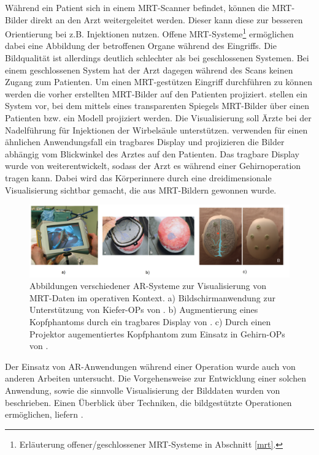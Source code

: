Während ein Patient sich in einem MRT-Scanner befindet, können die MRT-Bilder direkt an den Arzt weitergeleitet werden. Dieser kann diese zur besseren Orientierung bei z.B. Injektionen nutzen. Offene MRT-Systeme\footnote{Erläuterung offener/geschlossener MRT-Systeme in Abschnitt \ref{mrt}.} ermöglichen dabei eine Abbildung der betroffenen Organe während des Eingriffs. Die Bildqualität ist allerdings deutlich schlechter als bei geschlossenen Systemen. Bei einem geschlossenen System hat der Arzt dagegen während des Scans keinen Zugang zum Patienten. Um einen MRT-gestützen Eingriff durchführen zu können werden die vorher erstellten MRT-Bilder auf den Patienten projiziert.
\cite{Fritz2012} stellen ein System vor, bei dem mittels eines transparenten Spiegels MRT-Bilder über einen Patienten bzw. ein Modell projiziert werden. Die Visualisierung soll Ärzte bei der Nadelführung für Injektionen der Wirbelsäule unterstützen. 
\cite{khamene03} verwenden für einen ähnlichen Anwendungsfall ein tragbares Display und projizieren die Bilder abhängig vom Blickwinkel des Arztes auf den Patienten. Das tragbare Display wurde von \cite{khamene01} weiterentwickelt, sodass der Arzt es während einer Gehirnoperation tragen kann. Dabei wird das Körperinnere durch eine dreidimensionale Visualisierung sichtbar gemacht, die aus MRT-Bildern gewonnen wurde. 

\begin{figure}[!htb]
	\centering
	\includegraphics[width=0.9\linewidth]{images/relatedMedicine.png}
	\caption{Abbildungen verschiedener AR-Systeme zur Visualisierung von MRT-Daten im operativen Kontext. a) Bildschirmanwendung zur Unterstützung von Kiefer-OPs von \cite{MISCHKOWSKI2006478}. b) Augmentierung eines Kopfphantoms durch ein tragbares Display von \cite{Wendt03}. c) Durch einen Projektor augementiertes Kopfphantom zum Einsatz in Gehirn-OPs von \cite{Tabrizi15}.}
	\label{img:relatedMed}
\end{figure}
\FloatBarrier

Der Einsatz von AR-Anwendungen während einer Operation wurde auch von anderen Arbeiten untersucht.
Die Vorgehensweise zur Entwicklung einer solchen Anwendung, sowie die sinnvolle Visualisierung der Bilddaten wurden von \cite{grimson99} beschrieben. Einen Überblick über Techniken, die bildgestützte Operationen ermöglichen, liefern \cite{KerstenOertel2013TheSO}.

